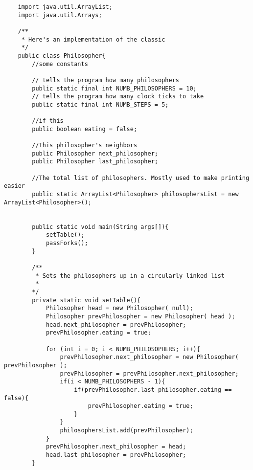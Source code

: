\documentclass[titlepage]{article}
\begin{document}
\begin{lstlisting}
    import java.util.ArrayList;
    import java.util.Arrays;
    
    /**
     * Here's an implementation of the classic 
     */
    public class Philosopher{
        //some constants
        
        // tells the program how many philosophers
        public static final int NUMB_PHILOSOPHERS = 10;
        // tells the program how many clock ticks to take
        public static final int NUMB_STEPS = 5;
    
        //if this
        public boolean eating = false; 
    
        //This philosopher's neighbors
        public Philosopher next_philosopher;
        public Philosopher last_philosopher;
    
        //The total list of philosophers. Mostly used to make printing easier
        public static ArrayList<Philosopher> philosophersList = new ArrayList<Philosopher>();
    
        
        public static void main(String args[]){
            setTable();
            passForks();
        }
    
        /**
         * Sets the philosophers up in a circularly linked list
         * 
        */
        private static void setTable(){
            Philosopher head = new Philosopher( null);
            Philosopher prevPhilosopher = new Philosopher( head );
            head.next_philosopher = prevPhilosopher;
            prevPhilosopher.eating = true;
    
            for (int i = 0; i < NUMB_PHILOSOPHERS; i++){
                prevPhilosopher.next_philosopher = new Philosopher( prevPhilosopher );
                prevPhilosopher = prevPhilosopher.next_philosopher;
                if(i < NUMB_PHILOSOPHERS - 1){
                    if(prevPhilosopher.last_philosopher.eating == false){
                        prevPhilosopher.eating = true;
                    }
                }
                philosophersList.add(prevPhilosopher);
            }
            prevPhilosopher.next_philosopher = head;
            head.last_philosopher = prevPhilosopher;
        }
    

\end{lstlisting}
\end{document}
